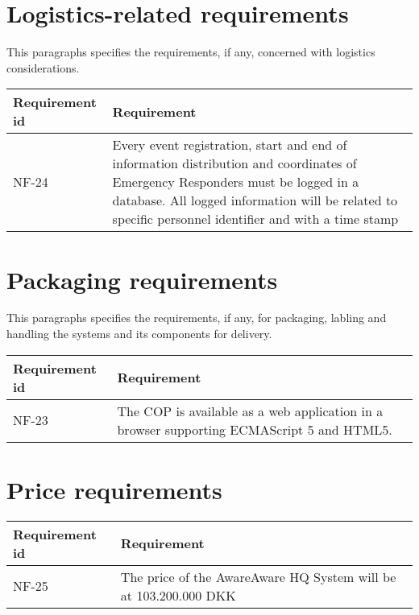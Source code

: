 \section{Logistics-related requirements}
This paragraphs specifies the requirements, if  any, concerned with logistics considerations.

\begin{longtable}{| p{3.2cm} |  p{10cm} | }
	\hline
	\textbf{Requirement id} &  \textbf{Requirement } \\
	\hline
	NF-24 & Every event registration, start and end of information distribution and coordinates of Emergency Responders must be logged in a database. All logged information will be related to specific personnel identifier and with a time stamp  \\
	\hline
\end{longtable}

\newpage
\label{sec_nonFunc7}
\section{Packaging requirements}
This paragraphs specifies the requirements, if any, for packaging, labling and handling the systems and its components for delivery.

\begin{longtable}{| p{3.2cm} |  p{10cm} | }
	\hline
	\textbf{Requirement id} &  \textbf{Requirement } \\
	\hline
	NF-23 & The COP is available as a web application in a browser supporting ECMAScript 5 and HTML5. \\
	\hline
\end{longtable}

\section{Price requirements}

\begin{longtable}{| p{3.2cm} |  p{10cm} | }
	\hline
	\textbf{Requirement id} &  \textbf{Requirement } \\
	\hline
	NF-25 & The price of the AwareAware HQ System will be at 103.200.000 DKK  \\
	\hline
\end{longtable}